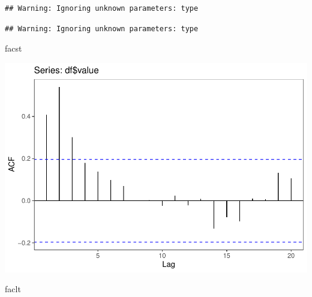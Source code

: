 \documentclass[]{article}
\newenvironment{Shaded}{\begin{snugshade}}{\end{snugshade}}
\newcommand{\DataTypeTok}[1]{\textcolor[rgb]{0.13,0.29,0.53}{#1}}
\newcommand{\DecValTok}[1]{\textcolor[rgb]{0.00,0.00,0.81}{#1}}
\newcommand{\KeywordTok}[1]{\textcolor[rgb]{0.13,0.29,0.53}{\textbf{#1}}}
\newcommand{\NormalTok}[1]{#1}
\newcommand{\OperatorTok}[1]{\textcolor[rgb]{0.81,0.36,0.00}{\textbf{#1}}}
\newcommand{\StringTok}[1]{\textcolor[rgb]{0.31,0.60,0.02}{#1}}
\begin{document}
\begin{verbatim}
## Warning: Ignoring unknown parameters: type
\end{verbatim}

\begin{Shaded}
\end{Shaded}

\begin{verbatim}
## Warning: Ignoring unknown parameters: type
\end{verbatim}

\begin{Shaded}
\begin{Highlighting}[]
\NormalTok{facst}
\end{Highlighting}
\end{Shaded}

\includegraphics{Econo2_P4_files/figure-latex/plots-3.pdf}

\begin{Shaded}
\begin{Highlighting}[]
\NormalTok{faclt}
\end{Highlighting}
\end{Shaded}
\end{document}
